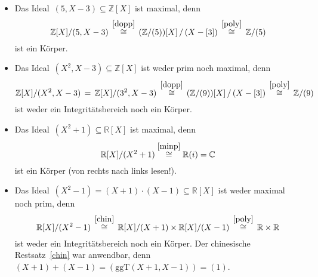 \documentclass[12pt,a4paper,ngerman]{scrartcl}
\newcommand{\R}{\mathbb{R}}
\newcommand{\C}{\mathbb{C}}
\newcommand{\Z}{\mathbb{Z}}
\theoremstyle{definition}
\theoremstyle{plain}
\theoremstyle{remark}
\begin{document}
\begin{itemize}
\item Das Ideal~$(5, X-3) \subseteq \Z[X]$ ist maximal, denn
\[ \Z[X]/(5, X-3) \,\stackrel{\eqref{dopp}}{\cong}\, (\Z/(5))[X]\,/\,(X-[3])
\,\stackrel{\eqref{poly}}{\cong}\, \Z/(5) \]
ist ein Körper.
\item Das Ideal~$(X^2, X-3) \subseteq \Z[X]$ ist weder prim noch maximal, denn
\[ \Z[X]/(X^2, X-3) \,=\, \Z[X]/(3^2, X-3) \,\stackrel{\eqref{dopp}}{\cong}\,
(\Z/(9))[X]\,/\,(X-[3]) \,\stackrel{\eqref{poly}}{\cong}\, \Z/(9) \]
ist weder ein Integritätsbereich noch ein Körper.
\item Das Ideal~$(X^2+1) \subseteq \R[X]$ ist maximal, denn
\[ \R[X] / (X^2+1) \stackrel{\eqref{minp}}{\cong} \R(i) = \C \]
ist ein Körper (von rechts nach links lesen!).
\item Das Ideal~$(X^2-1) = (X+1) \cdot (X-1) \subseteq \R[X]$ ist weder
maximal noch prim, denn
\[ \R[X]/(X^2-1) \,\stackrel{\eqref{chin}}{\cong}\, \R[X]/(X+1) \times \R[X]/(X-1)
\,\stackrel{\eqref{poly}}{\cong}\, \R \times \R \]
ist weder ein Integritätsbereich noch ein Körper. Der chinesische
Restsatz~\eqref{chin} war
anwendbar, denn~$(X+1) + (X-1) = (\mathrm{ggT}(X+1,X-1)) = (1)$.
\end{itemize}
\end{document}
